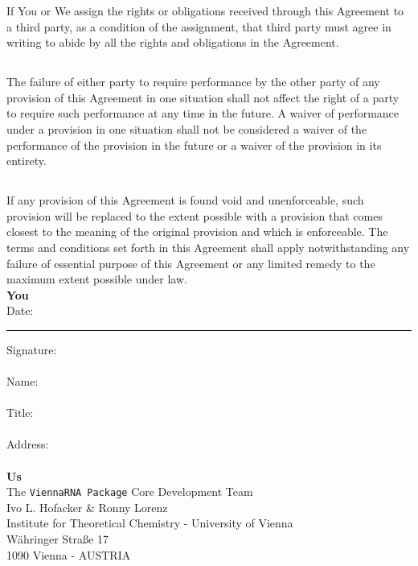 \documentclass{article}
\begin{document}
If You or We assign the rights or obligations received through this Agreement to
a third party, as a condition of the assignment, that third party must agree in
writing to abide by all the rights and obligations in the Agreement.

\subsection{}

The failure of either party to require performance by the other party of any
provision of this Agreement in one situation shall not affect the right of a
party to require such performance at any time in the future. A waiver of
performance under a provision in one situation shall not be considered a waiver
of the performance of the provision in the future or a waiver of the provision
in its entirety.

\subsection{}

If any provision of this Agreement is found void and unenforceable, such
provision will be replaced to the extent possible with a provision that comes
closest to the meaning of the original provision and which is enforceable. The
terms and conditions set forth in this Agreement shall apply notwithstanding any
failure of essential purpose of this Agreement or any limited remedy to the
maximum extent possible under law.\\

\vspace{1.5cm}
\noindent\textbf{You}\\
Date: \rule{0.2\textwidth}{0.5pt} Signature: \hrulefill \\\\
Name: \hrulefill\\\\
Title: \hrulefill\\\\
Address: \hrulefill\\
\hrulefill\\

\vspace{1cm}
\noindent\textbf{Us}\\
The \texttt{ViennaRNA Package} Core Development Team\\
Ivo L. Hofacker \& Ronny Lorenz\\
Institute for Theoretical Chemistry - University of Vienna\\
W{\"a}hringer Stra{\ss}e 17\\
1090 Vienna - AUSTRIA
\end{document}
